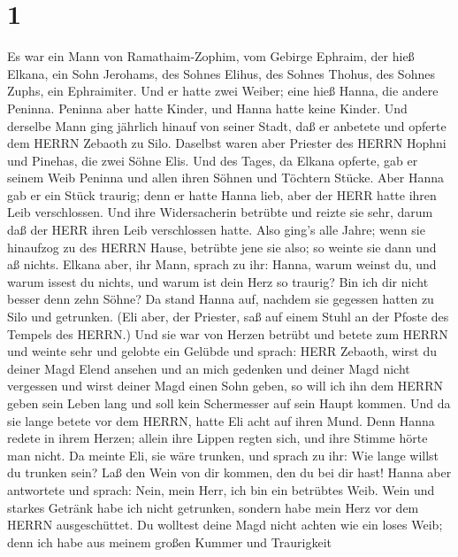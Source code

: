 \hypertarget{section}{%
\section{1}\label{section}}

 Es war ein Mann von Ramathaim-Zophim, vom Gebirge Ephraim,
der hieß Elkana, ein Sohn Jerohams, des Sohnes Elihus, des Sohnes
Thohus, des Sohnes Zuphs, ein Ephraimiter.  Und er hatte
zwei Weiber; eine hieß Hanna, die andere Peninna. Peninna aber hatte
Kinder, und Hanna hatte keine Kinder.  Und derselbe Mann
ging jährlich hinauf von seiner Stadt, daß er anbetete und opferte dem
HERRN Zebaoth zu Silo. Daselbst waren aber Priester des HERRN Hophni und
Pinehas, die zwei Söhne Elis.  Und des Tages, da Elkana
opferte, gab er seinem Weib Peninna und allen ihren Söhnen und Töchtern
Stücke.  Aber Hanna gab er ein Stück traurig; denn er hatte
Hanna lieb, aber der HERR hatte ihren Leib verschlossen. 
Und ihre Widersacherin betrübte und reizte sie sehr, darum daß der HERR
ihren Leib verschlossen hatte.  Also ging's alle Jahre; wenn
sie hinaufzog zu des HERRN Hause, betrübte jene sie also; so weinte sie
dann und aß nichts.  Elkana aber, ihr Mann, sprach zu ihr:
Hanna, warum weinst du, und warum issest du nichts, und warum ist dein
Herz so traurig? Bin ich dir nicht besser denn zehn Söhne? 
Da stand Hanna auf, nachdem sie gegessen hatten zu Silo und getrunken.
(Eli aber, der Priester, saß auf einem Stuhl an der Pfoste des Tempels
des HERRN.)  Und sie war von Herzen betrübt und betete zum
HERRN und weinte sehr  und gelobte ein Gelübde und sprach:
HERR Zebaoth, wirst du deiner Magd Elend ansehen und an mich gedenken
und deiner Magd nicht vergessen und wirst deiner Magd einen Sohn geben,
so will ich ihn dem HERRN geben sein Leben lang und soll kein
Schermesser auf sein Haupt kommen.  Und da sie lange betete
vor dem HERRN, hatte Eli acht auf ihren Mund.  Denn Hanna
redete in ihrem Herzen; allein ihre Lippen regten sich, und ihre Stimme
hörte man nicht. Da meinte Eli, sie wäre trunken,  und
sprach zu ihr: Wie lange willst du trunken sein? Laß den Wein von dir
kommen, den du bei dir hast!  Hanna aber antwortete und
sprach: Nein, mein Herr, ich bin ein betrübtes Weib. Wein und starkes
Getränk habe ich nicht getrunken, sondern habe mein Herz vor dem HERRN
ausgeschüttet.  Du wolltest deine Magd nicht achten wie ein
loses Weib; denn ich habe aus meinem großen Kummer und Traurigkeit
